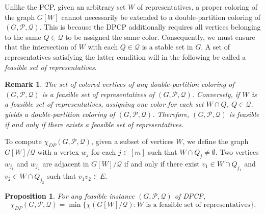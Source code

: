 \documentclass[preprint, 11pt, authoryear]{elsarticle}
\newtheorem{remark}{Remark}[section]
\newtheorem{proposition}{Proposition}[section]
\newtheorem{lemma}{Lemma}[section]
\newcommand{\PP}{{\mathcal P}}
\newcommand{\QQ}{{\mathcal Q}}
\newcommand{\dpcn}[1]{\chi_{DP}(#1)}
\newcommand{\quitar}[1]{{\color{red} \sout{#1}}}
\begin{document}
Unlike the PCP, given an arbitrary set $W$ of representatives, a proper coloring of the graph $G[W]$ cannot necessarily be extended to a double-partition coloring of $(G, \PP, \QQ)$. This is because the DPCP additionally requires all vertices 
belonging to the same $Q\in \QQ$ to be assigned the same color. Consequently, we must 
ensure that the intersection of $W$ with each $Q\in \QQ$ is a stable set in $G$. A set of representatives satisfying the latter condition will in the following be called a \emph{feasible set of representatives}.


\begin{remark}\label{lemma.feasible.solutions}
The set of colored vertices of any double-partition coloring of $(G,\PP,\QQ)$ is a feasible set of representatives of $(G,\PP,\QQ)$. Conversely, if $W$ is a feasible set of representatives,  assigning one color for each set $W \cap Q$, $Q \in \QQ$, yields a double-partition coloring of $(G,\PP,\QQ)$. Therefore, 
$(G,\PP,\QQ)$ is feasible if and only if %
there exists a feasible set of representatives.
\end{remark}



To compute $\dpcn{G,\PP,\QQ}$, given a subset of vertices $W$, we define the graph 
$G[W]/\QQ$ with a vertex $w_j$ for each $j \in [m]$ such that $W \cap Q_j \neq \emptyset$.
Two vertices $w_{j_1}$ and $w_{j_2}$ are adjacent in $G[W]/\QQ$ if and only if there exist $v_1 \in W \cap Q_{j_1}$ and $v_2 \in W \cap Q_{j_2}$ such that $v_1v_2 \in E$.



\begin{proposition}\label{prop.2.step.heuristic}
For any feasible instance $(G, \PP, \QQ)$ of DPCP, $$\dpcn{G,\PP,\QQ}=\min \{\chi(G[W]/\QQ): W \text{ is a feasible set of representatives} \}.$$ 
\end{proposition} 
\end{document}
